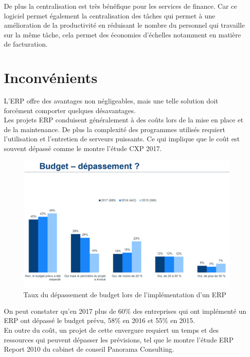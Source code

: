 De plus la centralisation est très bénéfique pour les services de finance. Car ce logiciel permet également la centralisation des tâches qui permet à une amélioration de la productivité en réduisant le nombre du personnel qui travaille sur la même tâche, cela permet des économies d’échelles notamment en matière de facturation.

\section{Inconvénients}
L’ERP offre des avantages non négligeables, mais une telle solution doit forcément comporter quelques désavantages.\\

Les projets ERP conduisent généralement à des coûts lors de la mise en place et de la maintenance. De plus la complexité des programmes utilisés requiert l’utilisation et l’entretien de serveurs puissants. Ce qui implique que le coût est souvent dépassé comme le montre l’étude CXP 2017.\\

\begin{figure}[H]
    \centering
    \includegraphics[scale=0.4]{ERP/graph-depassement-budget.jpg}
    \caption{Taux du dépassement de budget lors de l’implémentation d’un ERP}
\end{figure} 

On peut constater qu’en 2017 plus de 60\% des entreprises qui ont implémenté un ERP ont dépassé le budget prévu, 58\% en 2016 et 55\% en 2015.\\

En outre du coût, un projet de cette envergure requiert un temps et des ressources qui peuvent dépasser les prévisions, tel que le montre l’étude ERP Report 2010 du cabinet de conseil Panorama Consulting.\\

